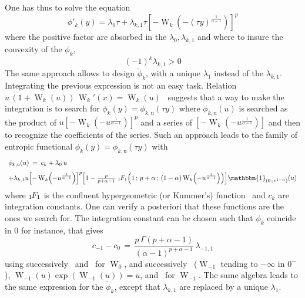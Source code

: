 \documentclass[entropy,article,submit,moreauthors,pdftex]{Definitions/mdpi}
\newcommand{\SZ}[1]{{\color{blue} #1}}
\def\X{\mathcal{X}}
\def\un{\mathbbm{1}}
\def\W{\operatorname{W}}
\newcommand{\hypgeom}[2]{\mbox{}_{#1}\hspace{-1pt}F_{#2}}
\begin{document}
One has thus to solve the equation
%
\[
\phi'_k(y) =  \lambda_0 \tau +  \lambda_{k,1} \tau  \left[ - \W_k\left(  - (\tau
  y)^{\frac{1}{\alpha - 1}} \right) \right]^p
\]
%
where the  positive factor  are absorbed in  the $\lambda_0,  \lambda_{k,1}$ and
where to insure the convexity of the $\phi_k$,
%
\[
(-1)^k \lambda_{k,1} > 0
\]
%
The  same  approach  allows  to   design  $\widetilde{\phi}_k$,  with  a  unique
$\lambda_1$ instead of the $\lambda_{k,1}$.  Integrating the previous expression
is   not  an   easy   task.   Relation   $u  \,   (1+\W_k(u))   \,  \W_k'(x)   =
\W_k(u)$~\cite[Eq.~3.2]{CorGon96} suggests that a way to make the integration is
to    search   for    $\phi_k(y)    =    \phi_{k,\mathrm{u}}(\tau   y)$    where
$\phi_{k,\mathrm{u}}(u)$ is searched  as the product of $u  \left[- \W_k\left( -
  u^{\frac{1}{\alpha-1}}  \right)  \right]^p  $  and   a  series  of  $\left[  -
  \W_k\left( - u^{\frac{1}{\alpha-1}} \right) \right]$ and then to recognize the
coefficients of  the series. Such  an approach leads  to the family  of entropic
functional $\phi_k(y) = \phi_{k,\mathrm{u}}(\tau y)$ with
%
\SZ{
\[\begin{array}{l}
\phi_{k,\mathrm{u}}(u) \: = \: c_k + \lambda_0 \, u\\[2.5mm]
%
+    \lambda_{k,1}     u   \left[    -   \W_k\left(   -
  u^{\frac{1}{\alpha-1}} \right) \right]^p \left[ 1 - \frac{p}{p+\alpha-1} \,\,
  \hypgeom{1}{1}\left(  1 \,  ; \,  p+\alpha \,  ; \,  (1-\alpha) \W_k  \left( -
  u^{\frac{1}{\alpha-1}}  \right)   \right)  \right]  \un_{\left(  0   \,  ;  \,
  e^{1-\alpha} \right)}(u)
\end{array}\]
}
%
where   $\hypgeom{1}{1}$  is   the   confluent   hypergeometric  (or   Kummer's)
function~\cite[\S~13]{AbrSte70}  and $c_k$  are integration  constants. One  can
verify  a posteriori  that these  functions  are the  ones we  search for.   The
integration constant
can be chosen such that $\phi_k$ coincide in 0 for instance, that gives
%
\[
c_{-1} - c_0 \, =  \, \frac{p \, \Gamma(p+\alpha-1)}{(\alpha-1)^{p+\alpha-1}} \,
\lambda_{-1,1}
\]
%
using successively~\cite[Eq.~3.1]{CorGon96}  and~\cite[Eq.~13.1.2]{AbrSte70} for
$\W_0$,  and  successively~\cite[Eq.~13.1.4]{AbrSte70}   ($\W_{-1}$  tending  to
$-\infty$ in  $0^{-}$), $\W_{-1}(u) \exp(\W_{-1}(u)) =  u$, and~\cite[Eq.~4.6 \&
  lines that  follow]{CorGon96} for  $\W_{-1}$.  The same  algebra leads  to the
same expression  for the  $\widetilde{\phi}_k$, except that  $\lambda_{k,1}$ are
replaced by a unique $\lambda_1$.
\end{document}
